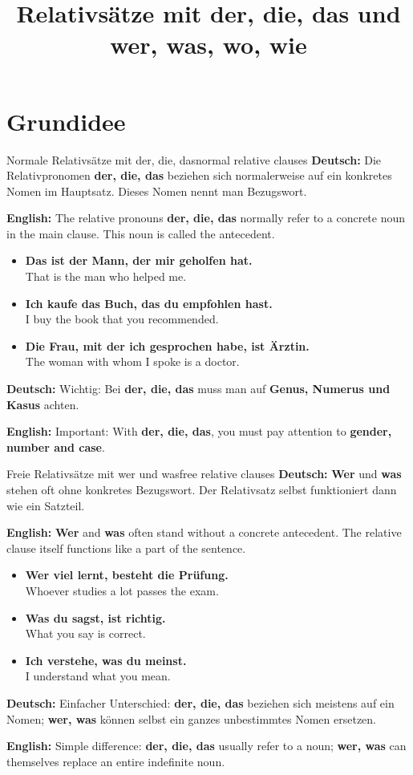 \documentclass[a4paper,11pt]{article}
\title{Relativsätze mit der, die, das und wer, was, wo, wie}
\date{}
\newcommand{\GermanText}[1]{\textbf{Deutsch: }#1\par}
\newcommand{\EnglishText}[1]{{\small\color{SoftGray}\textbf{English: }#1\par}}
\newcommand{\ExampleItem}[2]{\item \textbf{#1}\\{\small\color{SoftGray}#2}}
\begin{document}
    \maketitle
    \tableofcontents
    \newpage

\section{Grundidee}

\begin{grammarentry}{Normale Relativsätze mit der, die, das}{normal relative clauses}
\GermanText{Die Relativpronomen \textbf{der, die, das} beziehen sich normalerweise auf ein konkretes Nomen im Hauptsatz. Dieses Nomen nennt man Bezugswort.}
\EnglishText{The relative pronouns \textbf{der, die, das} normally refer to a concrete noun in the main clause. This noun is called the antecedent.}

\begin{exbox}
\begin{itemize}
    \ExampleItem{Das ist der Mann, der mir geholfen hat.}{That is the man who helped me.}
    \ExampleItem{Ich kaufe das Buch, das du empfohlen hast.}{I buy the book that you recommended.}
    \ExampleItem{Die Frau, mit der ich gesprochen habe, ist Ärztin.}{The woman with whom I spoke is a doctor.}
\end{itemize}
\end{exbox}

\GermanText{Wichtig: Bei \textbf{der, die, das} muss man auf \textbf{Genus, Numerus und Kasus} achten.}
\EnglishText{Important: With \textbf{der, die, das}, you must pay attention to \textbf{gender, number and case}.}
\end{grammarentry}

\begin{grammarentry}{Freie Relativsätze mit wer und was}{free relative clauses}
\GermanText{\textbf{Wer} und \textbf{was} stehen oft ohne konkretes Bezugswort. Der Relativsatz selbst funktioniert dann wie ein Satzteil.}
\EnglishText{\textbf{Wer} and \textbf{was} often stand without a concrete antecedent. The relative clause itself functions like a part of the sentence.}

\begin{exbox}
\begin{itemize}
    \ExampleItem{Wer viel lernt, besteht die Prüfung.}{Whoever studies a lot passes the exam.}
    \ExampleItem{Was du sagst, ist richtig.}{What you say is correct.}
    \ExampleItem{Ich verstehe, was du meinst.}{I understand what you mean.}
\end{itemize}
\end{exbox}

\GermanText{Einfacher Unterschied: \textbf{der, die, das} beziehen sich meistens auf ein Nomen; \textbf{wer, was} können selbst ein ganzes unbestimmtes Nomen ersetzen.}
\EnglishText{Simple difference: \textbf{der, die, das} usually refer to a noun; \textbf{wer, was} can themselves replace an entire indefinite noun.}
\end{grammarentry}
\end{document}
